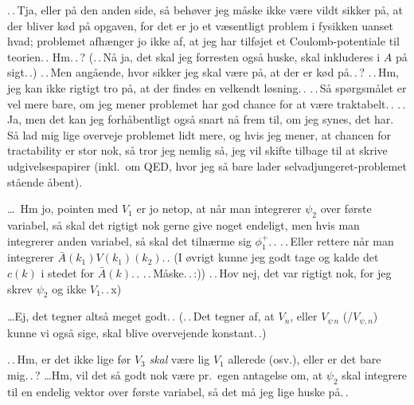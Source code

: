 \documentclass{report}
\begin{document}
.\,.\,Tja, eller på den anden side, så behøver jeg måske ikke være vildt sikker på, at der bliver kød på opgaven, for det er jo et væsentligt problem i fysikken uanset hvad; problemet afhænger jo ikke af, at jeg har tilføjet et Coulomb-potentiale til teorien.\,. Hm.\,.\,? (.\,.\,Nå ja, det skal jeg forresten også huske, skal inkluderes i $A$ på sigt.\,.) .\,.\,Men angående, hvor sikker jeg skal være på, at der er kød på.\,.\,? .\,.\,Hm, jeg kan ikke rigtigt tro på, at der findes en velkendt løsning.\,. .\,.\,Så spørgsmålet er vel mere bare, om jeg mener problemet har god chance for at være traktabelt.\,. .\,.\,Ja, men det kan jeg forhåbentligt også snart nå frem til, om jeg synes, det har. Så lad mig lige overveje problemet lidt mere, og hvis jeg mener, at chancen for tractability er stor nok, så tror jeg nemlig så, jeg vil skifte tilbage til at skrive udgivelsespapirer (inkl.\ om QED, hvor jeg så bare lader selvadjungeret-problemet stående åbent). 


\ldots\ Hm jo, pointen med $V_1$ er jo netop, at når man integrerer $\psi_2$ over første variabel, så skal det rigtigt nok gerne give noget endeligt, men hvis man integrerer anden variabel, så skal det tilnærme sig $\phi_1^+$.\,. .\,.\,Eller rettere når man integrerer $\bar{A}(k_1)V(k_1)(k_2)$.\,. (I øvrigt kunne jeg godt tage og kalde det $c(k)$ i stedet for $\bar{A}(k)$.\,. .\,.\,Måske.\,.\,:)) .\,.\,Hov nej, det var rigtigt nok, for jeg skrev $\psi_2$ og ikke $V_1$.\,.\,x) %

\ldots Ej, det tegner altså meget godt.\,. (.\,.\,Det tegner af, at $V_n$, eller $V_{\psi\,n}$ (/$V_{\psi, n}$) kunne vi også sige, skal blive overvejende konstant.\,.) 

.\,.\,Hm, er det ikke lige før $V_3$ \emph{skal} være lig $V_1$ allerede (osv.), eller er det bare mig.\,.\,? \ldots Hm, vil det så godt nok være pr.\ egen antagelse om, at $\psi_2$ skal integrere til en endelig vektor over første variabel, så det må jeg lige huske på.\,.
\end{document}
